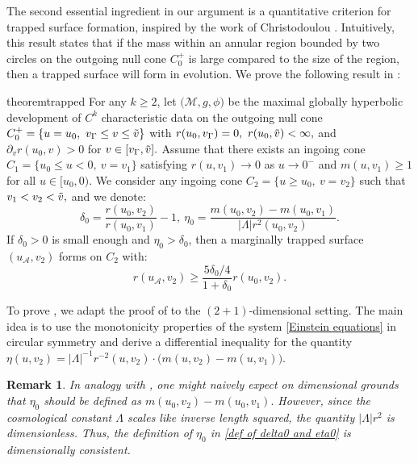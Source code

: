 \documentclass[11pt]{article}
\newtheorem{remark}{Remark}[section]
\numberwithin{equation}{section}
\begin{document}
The second essential ingredient in our argument is a quantitative criterion for trapped surface formation, inspired by the work of Christodoulou \cite{ChrBH}. Intuitively, this result states that if the mass within an annular region bounded by two circles on the outgoing null cone $C_0^+$ is large compared to the size of the region, then a trapped surface will form in evolution. We prove the following result in :
\begin{restatable}{theorem}{trapped}\label{trapped surface formation theorem}
    For any $k\geq 2$, let $\big(\mathcal{M},g,\phi\big)$ be the maximal globally hyperbolic development of $C^k$ characteristic data on the outgoing null cone $C_0^+=\{u=u_0,\ v_{\Gamma}\leq v\leq\Tilde{v}\}$ with $r(u_0,v_{\Gamma})=0,\ r(u_0,\Tilde{v})<\infty,$ and $\partial_vr(u_0,v)>0$ for $v\in[v_{\Gamma},\Tilde{v}].$ Assume that there exists an ingoing cone $C_1=\{u_0\leq u<0,\  v=v_1\}$ satisfying $r(u,v_1)\rightarrow0$ as $u\rightarrow0^-$ and $m(u,v_1)\geq1$ for all $u\in[u_0,0)$. We consider any ingoing cone $C_2=\{u\geq u_0,\ v=v_2\}$ such that $v_1<v_2<\Tilde{v},$ and we denote:
    \begin{equation}\label{def of delta0 and eta0}
        \delta_0=\frac{r(u_0,v_2)}{r(u_0,v_1)}-1,\ \eta_0=\frac{m(u_0,v_2)-m(u_0,v_1)}{|\Lambda|r^2(u_0,v_2)}.
    \end{equation}
    If $\delta_0>0$ is small enough and $\eta_0>\delta_0$, then a marginally trapped surface $(u_{\mathcal{A}},v_2)$ forms on $C_2$ with:
    \begin{equation}
        r(u_{\mathcal{A}},v_2)\geq\frac{5\delta_0/4}{1+\delta_0}r(u_0,v_2).
    \end{equation}
\end{restatable}

To prove , we adapt the proof of \cite{ChrBH} to the $(2+1)$-dimensional setting. The main idea is to use the monotonicity properties of the system \eqref{Einstein equations} in circular symmetry and derive a differential inequality for the quantity $\eta(u,v_2)=|\Lambda|^{-1}r^{-2}(u,v_2)\cdot\big(m(u,v_2)-m(u,v_1)\big).$

\begin{remark}
    In analogy with \cite{ChrBH}, one might naively expect on dimensional grounds that $\eta_0$ should be defined as $m(u_0,v_2)-m(u_0,v_1).$ However, since the cosmological constant $\Lambda$ scales like inverse length squared, the quantity $|\Lambda|r^2$ is dimensionless. Thus, the definition of $\eta_0$ in \eqref{def of delta0 and eta0} is dimensionally consistent.
\end{remark}
\end{document}
